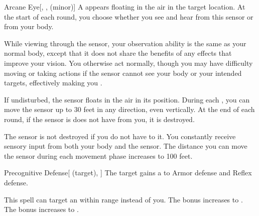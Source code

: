 \lowercase{\hypertarget{spell:Arcane Eye}{}}\label{spell:Arcane Eye}
\begin{freeability}[Rank 2]{\hypertarget{spell:Arcane Eye}{Arcane Eye}}[, ,  (minor)]
A  appears floating in the air in the target location.
At the start of each round, you choose whether you see and hear from this sensor or from your body.

While viewing through the sensor, your observation ability is the same as your normal body, except that it does not share the benefits of any  effects that improve your vision.
You otherwise act normally, though you may have difficulty moving or taking actions if the sensor cannot see your body or your intended targets, effectively making you \blinded.

If undisturbed, the sensor floats in the air in its position.
During each , you can move the sensor up to 30 feet in any direction, even vertically.
At the end of each round, if the sensor is does not have  from you, it is destroyed.

\rankline
{} The sensor is not destroyed if you do not have  to it.
 You constantly receive sensory input from both your body and the sensor.
 The distance you can move the sensor during each movement phase increases to 100 feet.

\end{freeability}
\vspace{0.25em}



\lowercase{\hypertarget{spell:Precognitive Defense}{}}\label{spell:Precognitive Defense}
\begin{attuneability}[Rank 2]{\hypertarget{spell:Precognitive Defense}{Precognitive Defense}}[ (target), ]
The target gains a   to Armor defense and Reflex defense.

\rankline
{} This spell can target an  within \rngmed range instead of you.
 The bonus increases to .
 The bonus increases to .

\end{attuneability}
\vspace{0.25em}



